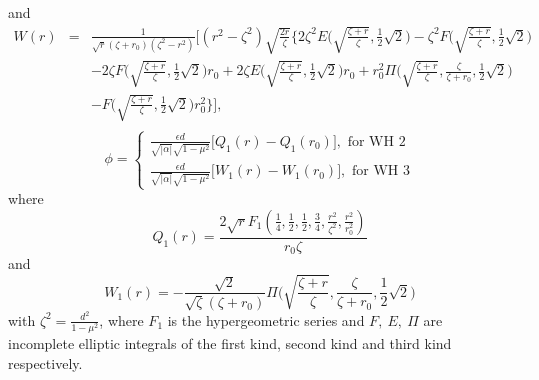\documentclass[10pt]{revtex4}
\begin{document}
  and
 \begin{eqnarray}
 W(r)&=&\frac{1}{\sqrt{r}(\zeta+r_0)(\zeta^2-r^2)}\Bigg[(r^2-\zeta^2)\sqrt{\frac{2r}{\zeta}}\biggl\{2\zeta^2E\biggl(\sqrt{\frac{\zeta+r}{\zeta}},\frac{1}{2}\sqrt{2}\biggr)-\zeta^2F\bigg(\sqrt{\frac{\zeta+r}{\zeta}},\frac{1}{2}\sqrt{2}\bigg)\\\nonumber
 &~&-2\zeta F\bigg(\sqrt{\frac{\zeta+r}{\zeta}},\frac{1}{2}\sqrt{2}\bigg)r_0+2\zeta E\bigg(\sqrt{\frac{\zeta+r}{\zeta}},\frac{1}{2}\sqrt{2}\bigg)r_0+r_0^2\Pi\bigg(\sqrt{\frac{\zeta+r}{\zeta}}, \frac{\zeta}{\zeta+r_0}, \frac{1}{2}\sqrt{2}\bigg)\\\nonumber
 &~&-F\bigg(\sqrt{\frac{\zeta+r}{\zeta}},\frac{1}{2}\sqrt{2}\bigg)r_0^2\biggr\}\Bigg],\\\nonumber
 \end{eqnarray}
 \begin{equation}
 \phi=
 \begin{cases}
 \frac{\epsilon d}{\sqrt{|\alpha|}\sqrt{1-\mu^2}}\big[Q_1(r)-Q_1(r_0)\big], \text{ for WH 2}\\
 \frac{\epsilon d}{\sqrt{|\alpha|}\sqrt{1-\mu^2}}\big[W_1(r)-W_1(r_0)\big], \text{ for WH 3}
 \end{cases}
 \end{equation}
 where
 \begin{equation*}
 Q_1(r)=\frac{2\sqrt{r}F_1(\frac{1}{4}, \frac{1}{2}, \frac{1}{2}, \frac{3}{4},\frac{r^2}{\zeta^2}, \frac{r^2}{r_0^2})}{r_0\zeta}
 \end{equation*}
 and 
 \begin{equation*}
 W_1(r)=-\frac{\sqrt{2}}{\sqrt{\zeta}(\zeta+r_0)}\Pi\bigg(\sqrt{\frac{\zeta+r}{\zeta}}, \frac{\zeta}{\zeta+r_0}, \frac{1}{2}\sqrt{2}\bigg)
 \end{equation*}
  with $\zeta^2=\frac{d^2}{1-\mu^2}$, where $F_1$ is the hypergeometric series and $F,~E,~\Pi$ are incomplete elliptic integrals of the first kind, second kind and third kind respectively.
  
\end{document}
